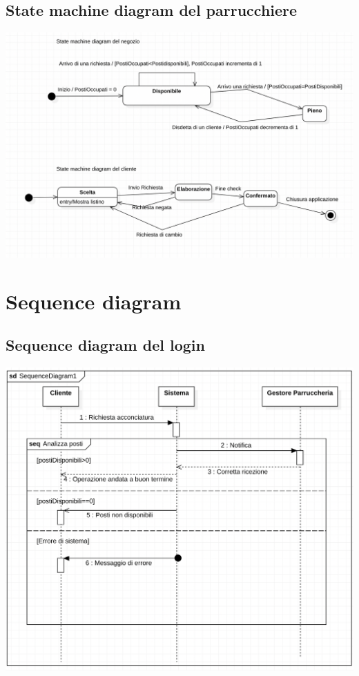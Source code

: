 \documentclass{article}
\begin{document}
\subsection{State machine diagram del parrucchiere}
\includegraphics[scale = 0.5]{Immagini/StateMachineDiagram.png}

\section{Sequence diagram}
\subsection{Sequence diagram del login}
\includegraphics[scale = 0.5]{Immagini/Sequence diagram Login.png}
\end{document}

